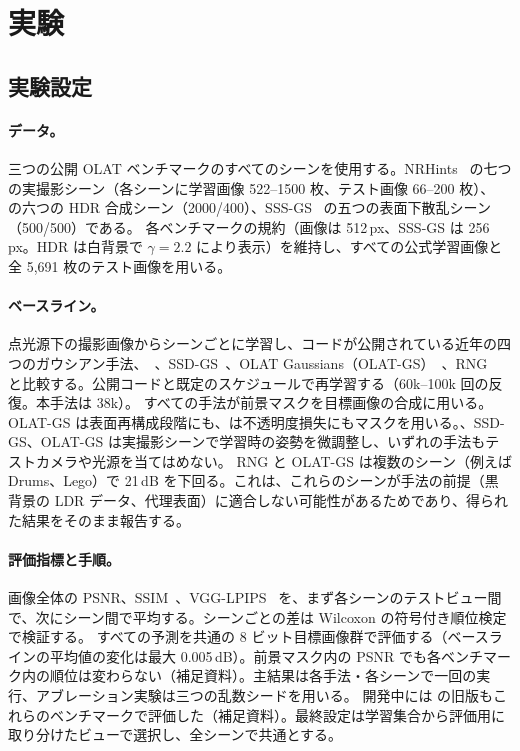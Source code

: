 \section{実験}
\label{sec:experiments}



\subsection{実験設定}
\label{sec:setup}
\paragraph{データ。}
三つの公開 OLAT ベンチマークのすべてのシーンを使用する。NRHints~\cite{zeng2023nrhints} の七つの実撮影シーン（各シーンに学習画像 522--1500 枚、テスト画像 66--200 枚）、\gsthree~\cite{bi2024gs3} の六つの HDR 合成シーン（2000/400）、SSS-GS~\cite{dihlmann2024sss} の五つの表面下散乱シーン（500/500）である。
各ベンチマークの規約（画像は 512\,px、SSS-GS は 256\,px。HDR は白背景で $\gamma=2.2$ により表示）を維持し、すべての公式学習画像と全 5,691 枚のテスト画像を用いる。

\paragraph{ベースライン。}
点光源下の撮影画像からシーンごとに学習し、コードが公開されている近年の四つのガウシアン手法、\gsthree~\cite{bi2024gs3}、SSD-GS~\cite{zheng2026ssdgs}、OLAT Gaussians（OLAT-GS）~\cite{kuang2024olat}、RNG~\cite{fan2025rng} と比較する。公開コードと既定のスケジュールで再学習する（60k--100k 回の反復。本手法は 38k）。
すべての手法が前景マスクを目標画像の合成に用いる。OLAT-GS は表面再構成段階にも、\ours は不透明度損失にもマスクを用いる。\gsthree、SSD-GS、OLAT-GS は実撮影シーンで学習時の姿勢を微調整し、いずれの手法もテストカメラや光源を当てはめない。
RNG と OLAT-GS は複数のシーン（例えば Drums、Lego）で 21\,dB を下回る。これは、これらのシーンが手法の前提（黒背景の LDR データ、代理表面）に適合しない可能性があるためであり、得られた結果をそのまま報告する。

\paragraph{評価指標と手順。}
画像全体の PSNR、SSIM~\cite{wang2004image}、VGG-LPIPS~\cite{zhang2018unreasonable} を、まず各シーンのテストビュー間で、次にシーン間で平均する。シーンごとの差は Wilcoxon の符号付き順位検定で検証する。
すべての予測を共通の 8 ビット目標画像群で評価する（ベースラインの平均値の変化は最大 0.005\,dB）。前景マスク内の PSNR でも各ベンチマーク内の順位は変わらない（補足資料）。主結果は各手法・各シーンで一回の実行、アブレーション実験は三つの乱数シードを用いる。
開発中には \ours の旧版もこれらのベンチマークで評価した（補足資料）。最終設定は学習集合から評価用に取り分けたビューで選択し、全シーンで共通とする。

